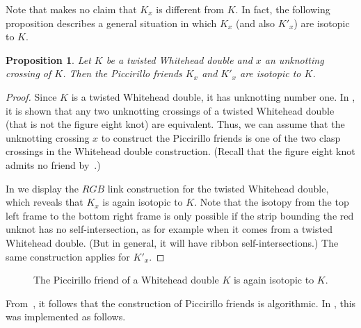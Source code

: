 \documentclass{amsart} %
\theoremstyle{thm}
\newtheorem{prop}[Theorem]{Proposition}
\theoremstyle{definition}
\numberwithin{equation}{section}
\begin{document}
Note that  makes no claim that $K_x$ is different from $K$. In fact, the following proposition describes a general situation in which $K_x$ (and also $K'_x$) are isotopic to $K$.

\begin{prop}\label{prop:Wdouble}
    Let $K$ be a twisted Whitehead double and $x$ an unknotting crossing of $K$. Then the Piccirillo friends $K_x$ and $K'_x$ are isotopic to $K$. 
\end{prop}

\begin{proof}
    Since $K$ is a twisted Whitehead double, it has unknotting number one. In \cite{Unknotting_WHD}, it is shown that any two unknotting crossings of a twisted Whitehead double (that is not the figure eight knot) are equivalent. Thus, we can assume that the unknotting crossing $x$ to construct the Piccirillo friends is one of the two clasp crossings in the Whitehead double construction. (Recall that the figure eight knot admits no friend by~\cite{Gabai}.)

    In  we display the $RGB$ link construction for the twisted Whitehead double, which reveals that $K_x$ is again isotopic to $K$. Note that the isotopy from the top left frame to the bottom right frame is only possible if the strip bounding the red unknot has no self-intersection, as for example when it comes from a twisted Whitehead double. (But in general, it will have ribbon self-intersections.) The same construction applies for $K'_x$.
\end{proof}

\begin{figure}[htbp] 
	\centering
	\def\svgwidth{0,9\columnwidth}
	
	\caption{The Piccirillo friend of a Whitehead double $K$ is again isotopic to $K$.}
	\label{fig:WHD}
\end{figure}

From~\cite{Piccirillo_Conway_knot}, it follows that the construction of Piccirillo friends is algorithmic. In \cite{Kegel_Weiss}, this was implemented as follows.
\end{document}
